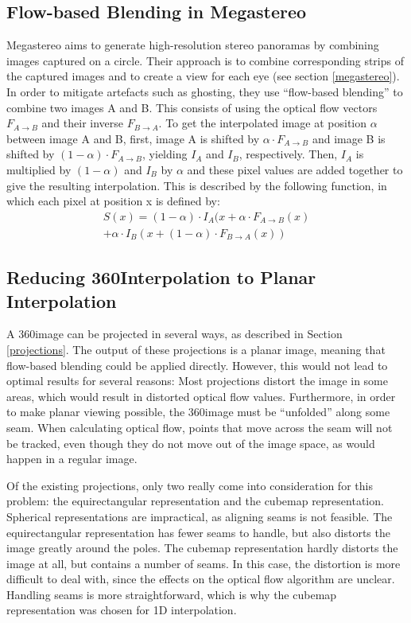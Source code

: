 \subsection{Flow-based Blending in Megastereo}
Megastereo aims to generate high-resolution stereo panoramas by combining images captured on a circle. Their approach is to combine corresponding strips of the captured images and to create a view for each eye (see section \ref{megastereo}). In order to mitigate artefacts such as ghosting, they use ``flow-based blending'' to combine two images A and B. This consists of using the optical flow vectors $F_{A\rightarrow B}$ and their inverse $F_{B\rightarrow A}$. To get the interpolated image at position $\alpha$ between image A and B, first, image A is shifted by $\alpha \cdot F_{A\to B}$ and image B is shifted by $(1 - \alpha) \cdot F_{A\to B}$, yielding $I_A$ and $I_B$, respectively. Then, $I_A$ is multiplied by $(1-\alpha)$ and $I_B$ by $\alpha$ and these pixel values are added together to give the resulting interpolation. This is described by the following function, in which each pixel at position x is defined by: 
\begin{align}
S(x) = (1-\alpha ) \cdot I_A( x + \alpha \cdot F_{A\to B}(x) \\
     + \alpha \cdot I_B( x + (1-\alpha) \cdot F_{B\to A}(x))
\end{align}

\subsection{Reducing 360\degree Interpolation to Planar Interpolation}

A 360\degree image can be projected in several ways, as described in Section \ref{projections}. The output of these projections is a planar image, meaning that flow-based blending could be applied directly. However, this would not lead to optimal results for several reasons: Most projections distort the image in some areas, which would result in distorted optical flow values. Furthermore, in order to make planar viewing possible, the 360\degree image must be ``unfolded'' along some seam. When calculating optical flow, points that move across the seam will not be tracked, even though they do not move out of the image space, as would happen in a regular image.

Of the existing projections, only two really come into consideration for this problem: the equirectangular representation and the cubemap representation. Spherical representations are impractical, as aligning seams is not feasible. The equirectangular representation has fewer seams to handle, but also distorts the image greatly around the poles. The cubemap representation hardly distorts the image at all, but contains a number of seams. In this case, the distortion is more difficult to deal with, since the effects on the optical flow algorithm are unclear. Handling seams is more straightforward, which is why the cubemap representation was chosen for 1D interpolation.

